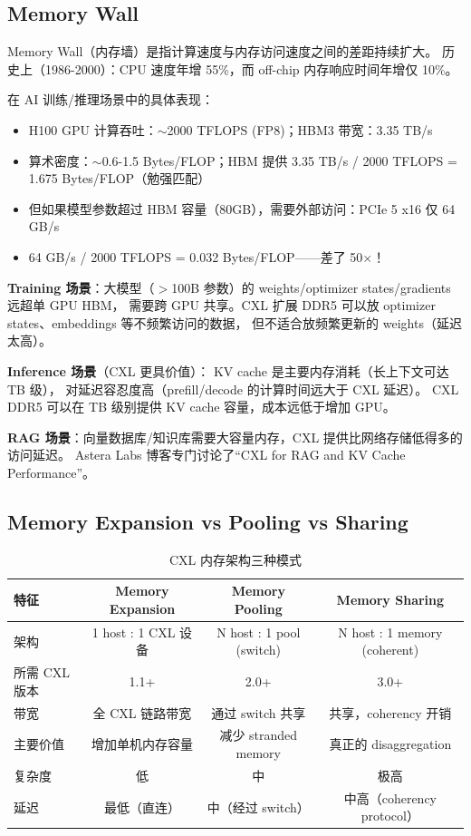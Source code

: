 \subsection{Memory Wall}

Memory Wall（内存墙）是指计算速度与内存访问速度之间的差距持续扩大。
历史上（1986-2000）：CPU 速度年增 55\%，而 off-chip 内存响应时间年增仅 10\%。

在 AI 训练/推理场景中的具体表现：
\begin{itemize}
    \item H100 GPU 计算吞吐：$\sim$2000 TFLOPS (FP8)；HBM3 带宽：3.35 TB/s
    \item 算术密度：$\sim$0.6-1.5 Bytes/FLOP；HBM 提供 3.35 TB/s / 2000 TFLOPS = 1.675 Bytes/FLOP（勉强匹配）
    \item 但如果模型参数超过 HBM 容量（80GB），需要外部访问：PCIe 5 x16 仅 64 GB/s
    \item 64 GB/s / 2000 TFLOPS = 0.032 Bytes/FLOP——差了 50$\times$！
\end{itemize}

\textbf{Training 场景}：大模型（$>$100B 参数）的 weights/optimizer states/gradients 远超单 GPU HBM，
需要跨 GPU 共享。CXL 扩展 DDR5 可以放 optimizer states、embeddings 等不频繁访问的数据，
但不适合放频繁更新的 weights（延迟太高）。

\textbf{Inference 场景}（CXL 更具价值）：
KV cache 是主要内存消耗（长上下文可达 TB 级），
对延迟容忍度高（prefill/decode 的计算时间远大于 CXL 延迟）。
CXL DDR5 可以在 TB 级别提供 KV cache 容量，成本远低于增加 GPU。

\textbf{RAG 场景}：向量数据库/知识库需要大容量内存，CXL 提供比网络存储低得多的访问延迟。
Astera Labs 博客专门讨论了``CXL for RAG and KV Cache Performance''。

\subsection{Memory Expansion vs Pooling vs Sharing}

\begin{table}[htb]
    \centering
    \caption{CXL 内存架构三种模式}
    \label{tab:cxl-modes}
    \begin{tabular}{lccc}
        \toprule
        \textbf{特征} & \textbf{Memory Expansion} & \textbf{Memory Pooling} & \textbf{Memory Sharing} \\
        \midrule
        架构 & 1 host : 1 CXL 设备 & N host : 1 pool (switch) & N host : 1 memory (coherent) \\
        所需 CXL 版本 & 1.1+ & 2.0+ & 3.0+ \\
        带宽 & 全 CXL 链路带宽 & 通过 switch 共享 & 共享，coherency 开销 \\
        主要价值 & 增加单机内存容量 & 减少 stranded memory & 真正的 disaggregation \\
        复杂度 & 低 & 中 & 极高 \\
        延迟 & 最低（直连） & 中（经过 switch） & 中高（coherency protocol） \\
        \bottomrule
    \end{tabular}
\end{table}

